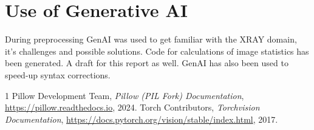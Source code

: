 \documentclass[conference]{IEEEtran}
\begin{document}
\section{Use of Generative AI}
During preprocessing GenAI was used to get familiar with the XRAY domain, it's
challenges and possible solutions. Code for calculations of image statistics has been
generated. A draft for this report as well. GenAI has also been used to speed-up syntax
corrections.
\begin{thebibliography}{1}
  Pillow Development Team,
  \textit{Pillow (PIL Fork) Documentation},
  \url{https://pillow.readthedocs.io}, 2024.
  Torch Contributors,
  \textit{Torchvision Documentation},
  \url{https://docs.pytorch.org/vision/stable/index.html}, 2017.
\end{thebibliography}
\end{document}
